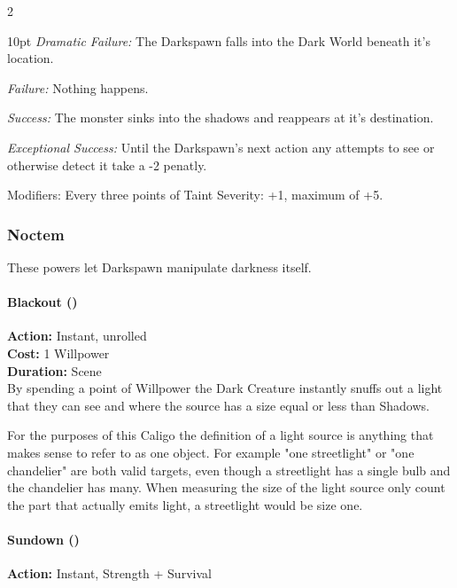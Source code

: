 \begin{multicols}{2}
\begin{myindentpar}{10pt} \emph{Dramatic Failure:} The Darkspawn falls into the Dark World beneath it's location. 

    \emph{Failure:} Nothing happens. 

    \emph{Success:} The monster sinks into the shadows and reappears at it's destination.

    \emph{Exceptional Success:} Until the Darkspawn's next action any attempts to see or otherwise detect it take a -2 penatly. 

    Modifiers: Every three points of Taint Severity: +1, maximum of +5. \end{myindentpar}


\subsubsection*{Noctem}

These powers let Darkspawn manipulate darkness itself. 

\paragraph*{Blackout (\textbullet)}

\noindent \textbf{Action:} Instant, unrolled\\

\noindent \textbf{Cost:} 1 Willpower\\

\noindent \textbf{Duration:} Scene \\

By spending a point of Willpower the Dark Creature instantly snuffs out a light that they can see and where the source has a size equal or less than Shadows.

For the purposes of this Caligo the definition of a light source is anything that makes sense to refer to as one object. For example "one streetlight" or "one chandelier" are both valid targets, even though a streetlight has a single bulb and the chandelier has many. When measuring the size of the light source only count the part that actually emits light, a streetlight would be size one.


\paragraph*{Sundown (\textbullet\textbullet\textbullet)}

\noindent \textbf{Action:} Instant, Strength + Survival\\


\end{multicols}
